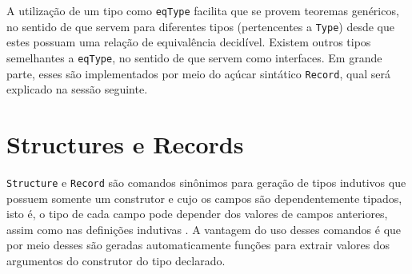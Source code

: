 A utilização de um tipo como \lstinline[language = coq]$eqType$ facilita que se provem teoremas genéricos, no sentido de que servem para diferentes tipos (pertencentes a \lstinline[language = coq]$Type$) desde que estes possuam uma relação de equivalência decidível. Existem outros tipos semelhantes a \lstinline[language = coq]$eqType$, no sentido de que servem como interfaces. Em grande parte, esses são implementados por meio do açúcar sintático \lstinline[language = coq]$Record$, qual será explicado na sessão seguinte.

\section{Structures e Records} 
\label{section:structs-e-records}

\lstinline[language = coq]$Structure$ e \lstinline[language = coq]$Record$ são comandos sinônimos para geração de tipos indutivos que possuem somente um construtor e cujo os campos são dependentemente tipados, isto é, o tipo de cada campo pode depender dos valores de campos anteriores, assim como nas definições indutivas \cite{assia_mahboubi_2022_7118596}. A vantagem do uso desses comandos é que por meio desses são geradas automaticamente funções para extrair valores dos argumentos do construtor do tipo declarado.

